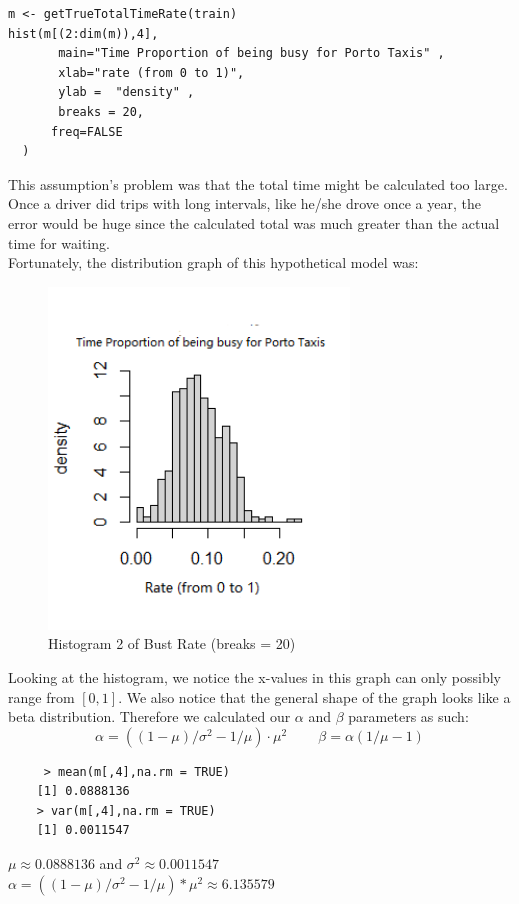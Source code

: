 \documentclass[letterpaper, 12 pt, conference]{article}
\begin{document}
\begin{enumerate}
\begin{lstlisting}
m <- getTrueTotalTimeRate(train)
hist(m[(2:dim(m)),4],
       main="Time Proportion of being busy for Porto Taxis" ,
       xlab="rate (from 0 to 1)",
       ylab =  "density" ,
       breaks = 20,
      freq=FALSE
  )
    \end{lstlisting}
    This assumption's problem was that the total time might be calculated too large. Once a driver did trips with long intervals, like he/she drove once a year, the error would be huge since the calculated total was much greater than the actual time for waiting.
    \\Fortunately, the distribution graph of this hypothetical model was:\begin{figure}[H]
    \centering
    \includegraphics[width=8cm]{B2Hist2.png}
    \caption{Histogram 2 of Bust Rate (breaks = 20)}
    \label{fig:b2hist2}
    \end{figure}
   Looking at the histogram, we notice the x-values in this graph can only possibly range from $[0,1]$. We also notice that the general shape of the graph looks like a beta distribution. Therefore we calculated our $\alpha$ and $\beta$ parameters as such: 
   \begin{equation}
    \alpha = ( (1-\mu)/\sigma^2- 1/\mu)\cdot \mu^2 \;\;\;\;\;\;\;\;
    \beta = \alpha (1/\mu -1)
   \end{equation}
   \begin{lstlisting}
     > mean(m[,4],na.rm = TRUE)
    [1] 0.0888136
    > var(m[,4],na.rm = TRUE)
    [1] 0.0011547
   \end{lstlisting}
    $\mu \approx  0.0888136$ and $\sigma^2 \approx 0.0011547$ 
   \\ $\alpha = ( (1-\mu)/\sigma^2- 1/\mu)* \mu^2 \approx 6.135579$

\end{enumerate}
\end{document}
